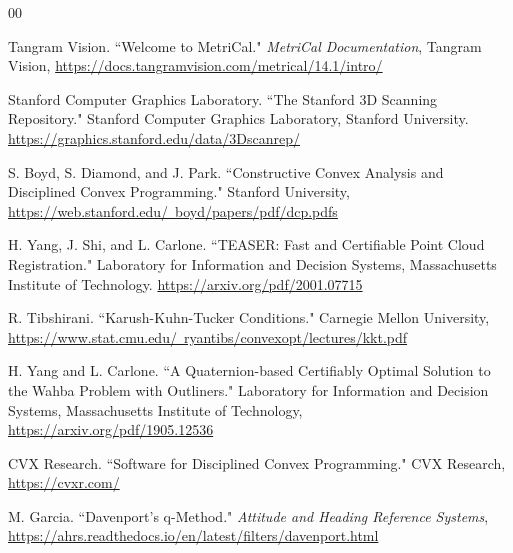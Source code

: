 \documentclass[conference]{IEEEtran}
\begin{document}
\begin{thebibliography}{00}

 Tangram Vision. ``Welcome to MetriCal." \textit{MetriCal Documentation}, Tangram Vision, \href{https://docs.tangramvision.com/metrical/14.1/intro/}{https://docs.tangramvision.com/metrical/14.1/intro/}

 Stanford Computer Graphics Laboratory. ``The Stanford 3D Scanning Repository." Stanford Computer Graphics Laboratory, Stanford University. \href{https://graphics.stanford.edu/data/3Dscanrep/}{https://graphics.stanford.edu/data/3Dscanrep/}

 S. Boyd, S. Diamond, and J. Park. ``Constructive Convex Analysis and Disciplined Convex Programming." Stanford University, \href{https://web.stanford.edu/~boyd/papers/pdf/dcp.pdf}{https://web.stanford.edu/~boyd/papers/pdf/dcp.pdfs}

 H. Yang, J. Shi, and L. Carlone. ``TEASER: Fast and Certifiable Point Cloud Registration." Laboratory for Information and Decision Systems, Massachusetts Institute of Technology. \href{https://arxiv.org/pdf/2001.07715}{https://arxiv.org/pdf/2001.07715}

 R. Tibshirani. ``Karush-Kuhn-Tucker Conditions." Carnegie Mellon University, \href{https://www.stat.cmu.edu/~ryantibs/convexopt/lectures/kkt.pdf}{https://www.stat.cmu.edu/~ryantibs/convexopt/lectures/kkt.pdf}

 H. Yang and L. Carlone. ``A Quaternion-based Certifiably Optimal Solution to the Wahba Problem with Outliners." Laboratory for Information and Decision Systems, Massachusetts Institute of Technology, \href{https://arxiv.org/pdf/1905.12536}{https://arxiv.org/pdf/1905.12536}

 CVX Research. ``Software for Disciplined Convex Programming." CVX Research, \href{https://cvxr.com/}{https://cvxr.com/}

 M. Garcia. ``Davenport's q-Method." \textit{Attitude and Heading Reference Systems}, \href{https://ahrs.readthedocs.io/en/latest/filters/davenport.html}{https://ahrs.readthedocs.io/en/latest/filters/davenport.html}

\end{thebibliography}
\end{document}
